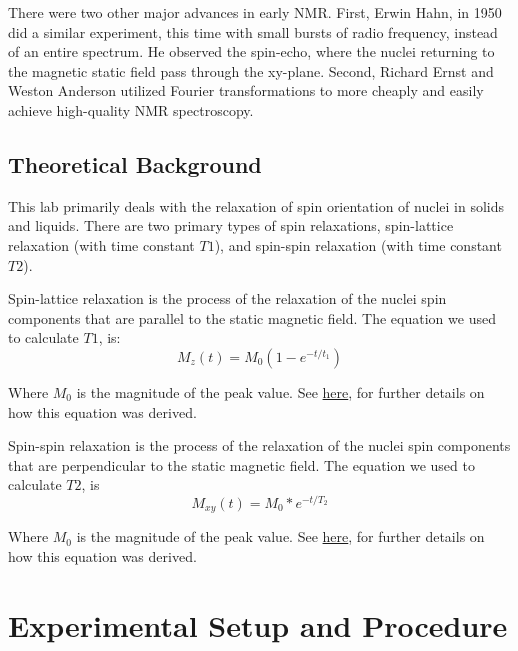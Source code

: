 \documentclass{article}
\begin{document}
\bigskip

There were two other major advances in early NMR. First, Erwin Hahn, in 1950 did a similar experiment, this time with small bursts of radio frequency, instead of an entire spectrum. He observed the spin-echo, where the nuclei returning to the magnetic static field pass through the xy-plane. Second, Richard Ernst and Weston Anderson utilized Fourier transformations to more cheaply and easily achieve high-quality NMR spectroscopy.

\bigskip


    
\subsection{Theoretical Background}
    
    This lab primarily deals with the relaxation of spin orientation of nuclei in solids and liquids. There are two primary types of spin relaxations, spin-lattice relaxation (with time constant $T1$), and spin-spin relaxation (with time constant $T2$). 

    \bigskip
    
    Spin-lattice relaxation is the process of the relaxation of the nuclei spin components that are parallel to the static magnetic field. The equation we used to calculate $T1$, is: $$M_{z}(t) = M_{0}(1-e^{-t/t_{1}})$$
    
    Where $M_{0}$ is the magnitude of the peak value. See \href{https://ocw.mit.edu/courses/physics/8-13-14-experimental-physics-i-ii-junior-lab-fall-2016-spring-2017/experiments/pulsed-nmr-spin-echoes/MIT8_13-14F16-S17exp12.pdf}{here}, for further details on how this equation was derived.
    
    \bigskip

    Spin-spin relaxation is the process of the relaxation of the nuclei spin components that are perpendicular to the static magnetic field. The equation we used to calculate $T2$, is $$M_{xy}(t) = M_{0}*e^{-t/T_{2}}$$
    
    Where $M_{0}$ is the magnitude of the peak value. 
    See \href{https://ocw.mit.edu/courses/physics/8-13-14-experimental-physics-i-ii-junior-lab-fall-2016-spring-2017/experiments/pulsed-nmr-spin-echoes/MIT8_13-14F16-S17exp12.pdf}{here}, for further details on how this equation was derived.

\section{Experimental Setup and Procedure}
    
\end{document}
